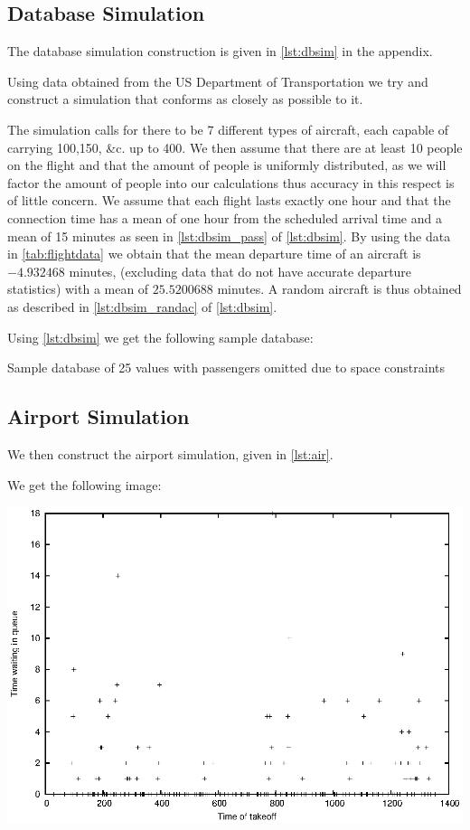 \documentclass[titlepage]{article}
\numberwithin{equation}{section}
\begin{document}
\subsection{Database Simulation}
The database simulation construction is given in \autoref{lst:dbsim} in the appendix.

Using data obtained from the US Department of Transportation \cite{USDoTData} we try and construct a simulation that conforms as closely as possible to it. 

The simulation calls for there to be 7 different types of aircraft, each capable of carrying 100,150, \&c. up to 400. We then assume that there are  at least 10 people on the flight and that the amount of people is uniformly distributed, as we will factor the amount of people into our calculations thus accuracy in this respect is of little concern.
We assume that each flight lasts exactly one hour and that the connection time has a mean of one hour from the scheduled arrival time and a mean of 15 minutes as seen in \autoref{lst:dbsim_pass} of \autoref{lst:dbsim}. By using the data in \autoref{tab:flightdata} we obtain that the mean departure time of an aircraft is $-4.932468$ minutes, (excluding data that do not have accurate departure statistics) with a mean of $25.5200688$ minutes. A random aircraft is thus obtained as described in \autoref{lst:dbsim_randac} of \autoref{lst:dbsim}.

Using \autoref{lst:dbsim} we get the following sample database:

\begin{table}[h!]
\caption{Sample database of 25 values with passengers omitted due to space constraints}
\label{tab:sampledata}
\centering
{}
\end{table}

\subsection{Airport Simulation}
We then construct the airport simulation, given in \autoref{lst:air}.

We get the following image:

\includegraphics{test.eps}
\end{document}

